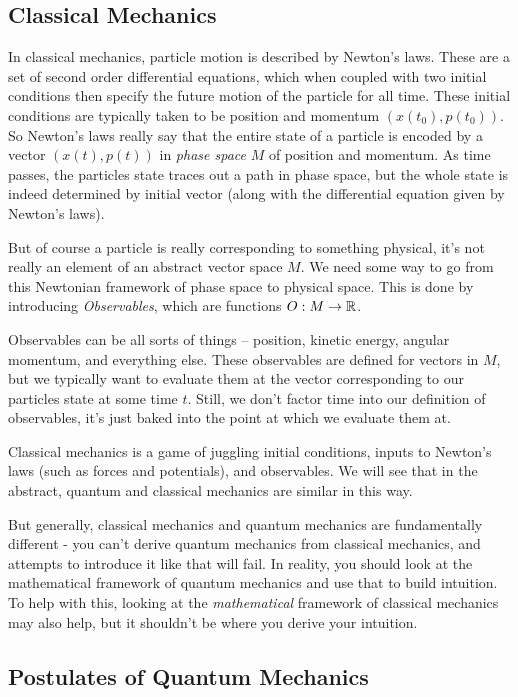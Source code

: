 \documentclass[a4paper]{scrartcl}
\begin{document}
\subsection{Classical Mechanics}

In classical mechanics, particle motion is described by Newton's laws. These are a set of second order differential equations, which when coupled with two initial conditions then specify the future motion of the particle for all time. These initial conditions are typically taken to be position and momentum $(x(t_0), p(t_0)).$ So Newton's laws really say that the entire state of a particle is encoded by a vector $(x(t), p(t))$ in \emph{phase space} $M$ of position and momentum. As time passes, the particles state traces out a path in phase space, but the whole state is indeed determined by initial vector (along with the differential equation given by Newton's laws).

But of course a particle is really corresponding to something physical, it's not really an element of an abstract vector space $M$. We need some way to go from this Newtonian framework of phase space to physical space. This is done by introducing \emph{Observables}, which are functions $O: M \rightarrow \mathbb{R}$.

Observables can be all sorts of things -- position, kinetic energy, angular momentum, and everything else. These observables are defined for vectors in $M$, but we typically want to evaluate them at the vector corresponding to our particles state at some time $t$. Still, we don't factor time into our definition of observables, it's just baked into the point at which we evaluate them at.

Classical mechanics is a game of juggling initial conditions, inputs to Newton's laws (such as forces and potentials), and observables. We will see that in the abstract, quantum and classical mechanics are similar in this way.

But generally, classical mechanics and quantum mechanics are fundamentally different - you can't derive quantum mechanics from classical mechanics, and attempts to introduce it like that will fail. In reality, you should look at the mathematical framework of quantum mechanics and use that to build intuition. To help with this, looking at the \emph{mathematical} framework of classical mechanics may also help, but it shouldn't be where you derive your intuition.

\subsection{Postulates of Quantum Mechanics}
\end{document}
